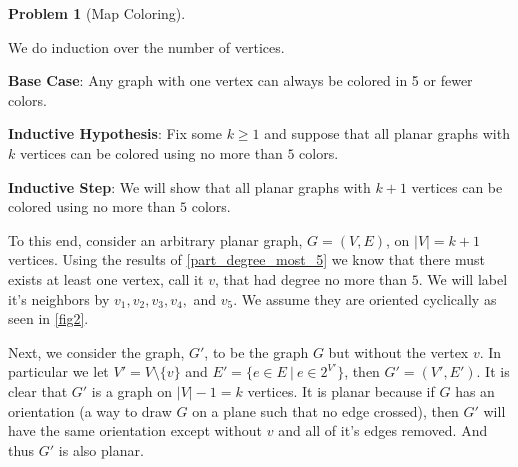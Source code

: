 \documentclass{article}
\theoremstyle{plain}
\theoremstyle{definition}
\newtheorem{problem}{Problem}
\begin{document}
\begin{problem}[Map Coloring]
\begin{enumerate}
\begin{enumerate}
                
            \begin{solution}
                We do induction over the number of vertices.
    
                \textbf{Base Case}: Any graph with one vertex can always be colored in 5 or fewer colors.
    
                \textbf{Inductive Hypothesis}: Fix some \(k \geq 1\) and suppose that all planar graphs with \(k\) vertices can be colored using no more than \(5\) colors.
    
                \textbf{Inductive Step}: We will show that all planar graphs with \(k+1\) vertices can be colored using no more than \(5\) colors.
    
                To this end, consider an arbitrary planar graph, \(G=(V,E)\), on \(|V|=k+1\) vertices. Using the results of \cref{part_degree_most_5} we know that there must exists at least one vertex, call it \(v\), that had degree no more than \(5\). We will label it's neighbors by \(v_1,v_2,v_3,v_4,\) and \(v_5\). We assume they are oriented cyclically as seen in \cref{fig2}. 
    
                Next, we consider the graph, \(G'\), to be the graph \(G\) but without the vertex \(v\). In particular we let \(V' = V \setminus \{v\}\) and \(E' = \{e \in E\ |\ e \in 2^{V'}\}\), then \(G' = (V',E')\). It is clear that \(G'\) is a graph on \(|V| - 1 = k\) vertices. It is planar because if \(G\) has an orientation (a way to draw \(G\) on a plane such that no edge crossed), then \(G'\) will have the same orientation except without \(v\) and all of it's edges removed. And thus \(G'\) is also planar.  
            

\end{solution}
\end{enumerate}
\end{enumerate}
\end{problem}
\end{document}
